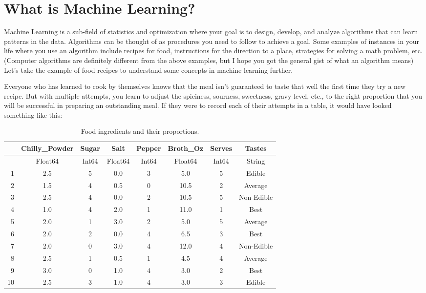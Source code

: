 \documentclass[
  letterpaper,
]{book}
\begin{document}
\hypertarget{sec-ml}{%
\section{What is Machine Learning?}\label{sec-ml}}

Machine Learning is a sub-field of statistics and optimization where
your goal is to design, develop, and analyze algorithms that can learn
patterns in the data. Algorithms can be thought of as procedures you
need to follow to achieve a goal. Some examples of instances in your
life where you use an algorithm include recipes for food, instructions
for the direction to a place, strategies for solving a math problem,
etc. (Computer algorithms are definitely different from the above
examples, but I hope you got the general gist of what an algorithm
means) Let's take the example of food recipes to understand some
concepts in machine learning further.

Everyone who has learned to cook by themselves knows that the meal isn't
guaranteed to taste that well the first time they try a new recipe. But
with multiple attempts, you learn to adjust the spiciness, sourness,
sweetness, gravy level, etc., to the right proportion that you will be
successful in preparing an outstanding meal. If they were to record each
of their attempts in a table, it would have looked something like this:

\hypertarget{reiepe_data}{}
\begin{table}
\caption{Food ingredients and their proportions.}

\centering
\begin{tabular}{r|ccccccc}
    & Chilly\_Powder & Sugar & Salt & Pepper & Broth\_Oz & Serves & Tastes\\
    \hline
    & Float64 & Int64 & Float64 & Int64 & Float64 & Int64 & String\\
    \hline
    1 & 2.5 & 5 & 0.0 & 3 & 5.0 & 5 & Edible \\
    2 & 1.5 & 4 & 0.5 & 0 & 10.5 & 2 & Average \\
    3 & 2.5 & 4 & 0.0 & 2 & 10.5 & 5 & Non-Edible \\
    4 & 1.0 & 4 & 2.0 & 1 & 11.0 & 1 & Best \\
    5 & 2.0 & 1 & 3.0 & 2 & 5.0 & 5 & Average \\
    6 & 2.0 & 2 & 0.0 & 4 & 6.5 & 3 & Best \\
    7 & 2.0 & 0 & 3.0 & 4 & 12.0 & 4 & Non-Edible \\
    8 & 2.5 & 1 & 0.5 & 1 & 4.5 & 4 & Average \\
    9 & 3.0 & 0 & 1.0 & 4 & 3.0 & 2 & Best \\
    10 & 2.5 & 3 & 1.0 & 4 & 3.0 & 3 & Edible \\
\end{tabular}
\end{table}
\end{document}
